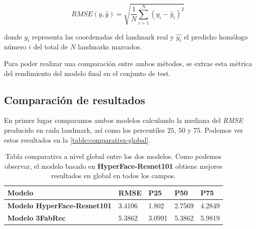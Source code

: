             \begin{equation}
                RMSE(y,\widehat{y})= \sqrt{\frac{1}{N} \sum_{i=1}^{N} (y_i-\widehat{y}_i)^2}
            \end{equation}

            \noindent donde $y_i$ representa las coordenadas del landmark real y $\widehat{y_i}$ el predicho homólogo número $i$ del total de $N$ landmarks marcados.

            \medskip

            \noindent Para poder realizar una comparación entre ambos métodos, se extrae esta métrica del rendimiento del modelo final en el conjunto de test. 

        \subsection{Comparación de resultados}
            \noindent En primer lugar comparamos ambos modelos calculando la mediana del \textit{RMSE} producido en cada landmark, así como los percentiles $25$, $50$ y $75$. Podemos ver estos resultados en la \autoref{table:comparativa-global}.

            \begin{table}[!ht]
                \centering
                \caption{Tabla comparativa a nivel global entre los dos modelos. Como podemos observar, el modelo basado en \textbf{HyperFace-Resnet101} obtiene mejores resultados en global en todos los campos.}
                \begin{tabular}{|l|l|l|l|l|}
                \hline
                    \cellcolor{gray!25}\textbf{Modelo} & \cellcolor{gray!25}\textbf{RMSE} & \cellcolor{gray!25}\textbf{P25} & \cellcolor{gray!25}\textbf{P50} & \cellcolor{gray!25}\textbf{P75} \\ \hline
                    \textbf{Modelo HyperFace-Resnet101} & \cellcolor{green!25}3.4106 & \cellcolor{green!25}1.802 & \cellcolor{green!25}2.7569 & \cellcolor{green!25}4.2849 \\ \hline
                    \textbf{Modelo 3FabRec} & 5.3862 & 3.0991 & 5.3862 & 5.9819 \\ \hline
                \end{tabular}
                \label{table:comparativa-global}
            \end{table}
            
            \medskip

